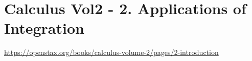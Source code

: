 \section{Calculus Vol2 - 2. Applications of Integration}

\url{https://openstax.org/books/calculus-volume-2/pages/2-introduction}

\clearpage
\clearpage
\clearpage
\clearpage
